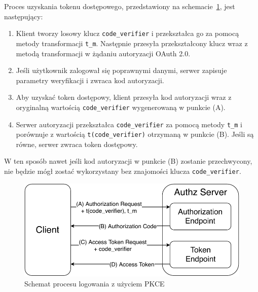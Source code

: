 	Proces uzyskania tokenu dostępowego, przedstawiony na schemacie~\ref{fig:pkce}, jest następujący:
	\begin{enumerate}[label=\Alph*.]
		\item Klient tworzy losowy klucz \verb|code_verifier| i przekształca go za pomocą metody transformacji \verb|t_m|.
			Następnie przesyła przekształcony klucz wraz z metodą transformacji w żądaniu autoryzacji OAuth 2.0.
		\item Jeśli użytkownik zalogował się poprawnymi danymi, serwer zapisuje parametry weryfikacji i zwraca kod autoryzacji.
		\item Aby uzyskać token dostępowy, klient przesyła kod autoryzacji wraz z oryginalną wartością \verb|code_verifier| wygenerowaną w punkcie (A).
		\item Serwer autoryzacji przekształca \verb|code_verifier| za pomocą metody \verb|t_m|
			i porównuje z wartością \verb|t(code_verifier)| otrzymaną w punkcie (B).
			Jeśli są równe, serwer zwraca token dostępowy.
	\end{enumerate}

	W ten sposób nawet jeśli kod autoryzacji w punkcie (B) zostanie przechwycony,
	nie będzie mógł zostać wykorzystany bez znajomości klucza \verb|code_verifier|.

	\begin{figure}[ht]
		\centering
			\includegraphics[width=0.7\linewidth]{rys03/pkce.pdf}
		 \caption{Schemat procesu logowania z użyciem PKCE}
		 \label{fig:pkce}
	\end{figure}
